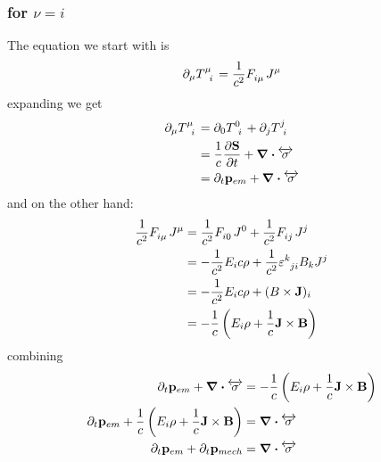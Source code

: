 \subsubsection{for $\nu=i$}
The equation we start with is 
\begin{equation}
  \partial_\mu\tensor{T}{^\mu_i} = \frac{1}{c^2}\tensor{F}{_i_\mu}J^\mu
\end{equation}
expanding we get
\begin{align}
	\partial_\mu\tensor{T}{^\mu_i} &= \partial_0\tensor{T}{^0_i}+\partial_j\tensor{T}{^j_i}\\
	&= \frac{1}{c}\diffp{\bold S}{t} + \div{\overleftrightarrow\sigma}\\
	&= \partial_t\bold p_{em}+ \div{\overleftrightarrow\sigma}
\end{align}
and on the other hand:
\begin{align}
	\frac{1}{c^2}\tensor{F}{_i_\mu}J^\mu &= \frac{1}{c^2}\tensor{F}{_i_0}J^0+\frac{1}{c^2}\tensor{F}{_i_j}J^j\\
	&= -\frac{1}{c^2}E_ic\rho+\frac{1}{c^2}\tensor{\epsilon}{^k_j_i}B_kJ^j\\
	&= -\frac{1}{c^2}E_ic\rho+\bold (B\times\bold J)_i\\
	&= -\frac{1}{c}\ins{E_i\rho+\frac{1}{c}\bold J\times\bold B}
\end{align}
combining
\begin{align}
	\partial_t\bold p_{em}+ \div{\overleftrightarrow\sigma} &= -\frac{1}{c}\left(E_i\rho+\frac{1}{c}\bold J\times\bold B\right)\\
	\partial_t\bold p_{em} + \frac{1}{c}\left(E_i\rho+\frac{1}{c}\bold J\times\bold B\right) &= \div{\overleftrightarrow\sigma}\\
	\partial_t\bold p_{em} + \partial_t\bold p_{mech} &= \div{\overleftrightarrow\sigma}
\end{align}